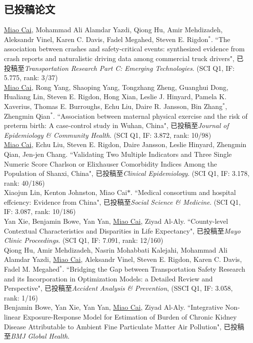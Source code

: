 \documentclass[11pt, a4paper]{article}
\newcommand{\years}[1]{\marginnote{\scriptsize #1}}
\begin{document}
\subsection*{已投稿论文}
\noindent
\years{2019}\underline{Miao Cai},  Mohammad Ali Alamdar Yazdi, Qiong Hu, Amir Mehdizadeh, Aleksandr Vinel, Karen C. Davis, Fadel Megahed, Steven E. Rigdon$^\ast$. ``The association between crashes and safety-critical events: synthesized evidence from crash reports and naturalistic driving data among commercial truck drivers", 已投稿至\emph{Transportation Research Part C: Emerging Technologies}. (SCI Q1, IF: 5.775, rank: 3/37)\\
\years{2019}\underline{Miao Cai}, Rong Yang, Shaoping Yang, Tongzhang Zheng, Guanghui Dong, Hualiang Lin, Steven E. Rigdon, Hong Xian, Leslie J. Hinyard, Pamela K. Xaverius, Thomas E. Burroughs, Echu Liu, Daire R. Jansson, Bin Zhang$^\ast$, Zhengmin Qian$^\ast$. ``Association between maternal physical exercise and the risk of preterm birth: A case-control study in Wuhan, China", 已投稿至\emph{Journal of Epidemiology \& Community Health}. (SCI Q1, IF: 3.872, rank: 10/98)\\
\years{2019}\underline{Miao Cai}, Echu Liu, Steven E. Rigdon, Daire Jansson, Leslie Hinyard, Zhengmin Qian, Jen-jen Chang. ``Validating Two Multiple Indicators and Three Single Numeric Score Charlson or Elixhauser Comorbidity Indices Among the Population of Shanxi, China", 已投稿至\emph{Clinical Epidemiology}. (SCI Q1, IF: 3.178, rank: 40/186)\\
Xiaojun Lin, Kenton Johnston, Miao Cai$*$. ``Medical consortium and hospital effciency: Evidence from China", 已投稿至\emph{Social Science \& Medicine}. (SCI Q1, IF: 3.087, rank: 10/186)\\
\years{2019}Yan Xie, Benjamin Bowe, Yan Yan, \underline{Miao Cai}, Ziyad Al-Aly. ``County-level Contextual Characteristics and Disparities in Life Expectancy", 已投稿至\emph{Mayo Clinic Proceedings}. (SCI Q1, IF: 7.091, rank: 12/160)\\
\years{2019}Qiong Hu, Amir Mehdizadeh, Nasrin Mohabbati Kalejahi, Mohammad Ali Alamdar Yazdi, \underline{Miao Cai}, Aleksandr Vinel, Steven E. Rigdon, Karen C. Davis, Fadel M. Megahed$^\ast$. ``Bridging the Gap between Transportation Safety Research and its Incorporation in Optimization Models: a Detailed Review and Perspective", 已投稿至\emph{Accident Analysis \& Prevention}, (SSCI Q1, IF: 3.058, rank: 1/16)\\
\years{2019}Benjamin Bowe, Yan Xie, Yan Yan, \underline{Miao Cai}, Ziyad Al-Aly. ``Integrative Non-linear Exposure-Response Model for Estimation of Burden of Chronic Kidney Disease Attributable to Ambient Fine Particulate Matter Air Pollution", 已投稿至\emph{BMJ Global Health}. 
\end{document}
